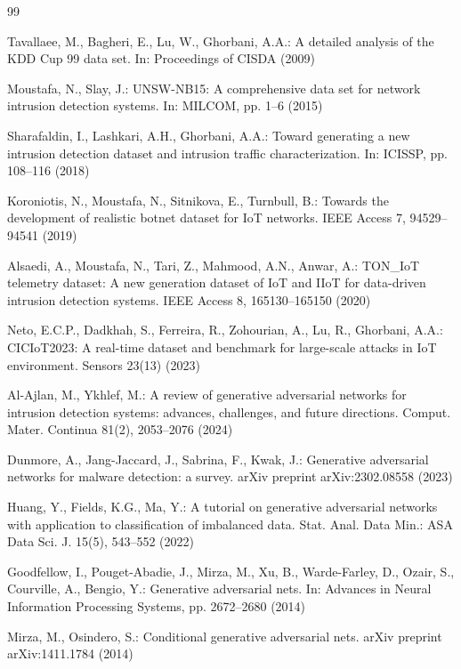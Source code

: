 \documentclass[11pt, a4paper]{article}
\begin{document}
\begin{thebibliography}{99}

Tavallaee, M., Bagheri, E., Lu, W., Ghorbani, A.A.: A detailed analysis of the KDD Cup 99 data set. In: Proceedings of CISDA (2009)

Moustafa, N., Slay, J.: UNSW-NB15: A comprehensive data set for network intrusion detection systems. In: MILCOM, pp. 1--6 (2015)

Sharafaldin, I., Lashkari, A.H., Ghorbani, A.A.: Toward generating a new intrusion detection dataset and intrusion traffic characterization. In: ICISSP, pp. 108--116 (2018)

Koroniotis, N., Moustafa, N., Sitnikova, E., Turnbull, B.: Towards the development of realistic botnet dataset for IoT networks. IEEE Access 7, 94529--94541 (2019)

Alsaedi, A., Moustafa, N., Tari, Z., Mahmood, A.N., Anwar, A.: TON\_IoT telemetry dataset: A new generation dataset of IoT and IIoT for data-driven intrusion detection systems. IEEE Access 8, 165130--165150 (2020)

Neto, E.C.P., Dadkhah, S., Ferreira, R., Zohourian, A., Lu, R., Ghorbani, A.A.: CICIoT2023: A real-time dataset and benchmark for large-scale attacks in IoT environment. Sensors 23(13) (2023)

Al-Ajlan, M., Ykhlef, M.: A review of generative adversarial networks for intrusion detection systems: advances, challenges, and future directions. Comput. Mater. Continua 81(2), 2053--2076 (2024)

Dunmore, A., Jang-Jaccard, J., Sabrina, F., Kwak, J.: Generative adversarial networks for malware detection: a survey. arXiv preprint arXiv:2302.08558 (2023)

Huang, Y., Fields, K.G., Ma, Y.: A tutorial on generative adversarial networks with application to classification of imbalanced data. Stat. Anal. Data Min.: ASA Data Sci. J. 15(5), 543--552 (2022)

Goodfellow, I., Pouget-Abadie, J., Mirza, M., Xu, B., Warde-Farley, D., Ozair, S., Courville, A., Bengio, Y.: Generative adversarial nets. In: Advances in Neural Information Processing Systems, pp. 2672--2680 (2014)

Mirza, M., Osindero, S.: Conditional generative adversarial nets. arXiv preprint arXiv:1411.1784 (2014)


\end{thebibliography}
\end{document}
